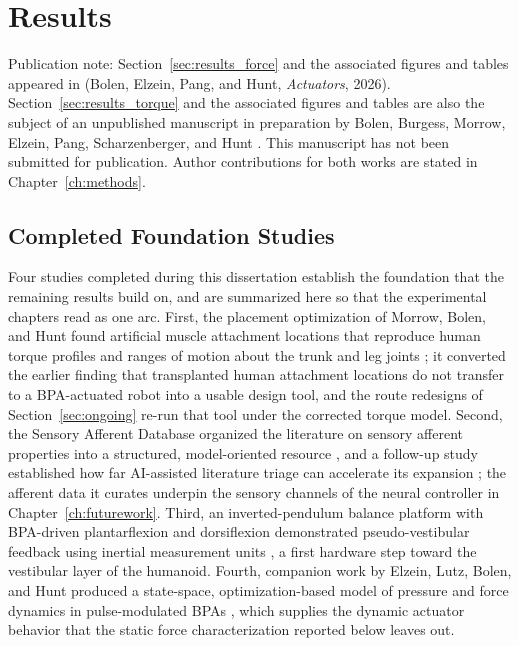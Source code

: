 \chapter{Results}\label{ch:results}

{\doublespacing\normalsize\upshape
\noindent Publication note: Section~\ref{sec:results_force} and the associated figures and tables appeared in \citet{bolen_2026} (Bolen, Elzein, Pang, and Hunt, \emph{Actuators}, 2026). Section~\ref{sec:results_torque} and the associated figures and tables are also the subject of an unpublished manuscript in preparation by Bolen, Burgess, Morrow, Elzein, Pang, Scharzenberger, and Hunt \citep{bolen_isometric_2025}. This manuscript has not been submitted for publication. Author contributions for both works are stated in Chapter~\ref{ch:methods}.\par}

\section{Completed Foundation Studies}\label{sec:foundation}

Four studies completed during this dissertation establish the foundation that the remaining results build on, and are summarized here so that the experimental chapters read as one arc. First, the placement optimization of Morrow, Bolen, and Hunt found artificial muscle attachment locations that reproduce human torque profiles and ranges of motion about the trunk and leg joints \citep{morrow_optimization_2020}; it converted the earlier finding that transplanted human attachment locations do not transfer to a BPA-actuated robot \citep{bolen_bipedal_2019, bolen_determination_2019} into a usable design tool, and the route redesigns of Section~\ref{sec:ongoing} re-run that tool under the corrected torque model. Second, the Sensory Afferent Database organized the literature on sensory afferent properties into a structured, model-oriented resource \citep{bolen_sensory_2023}, and a follow-up study established how far AI-assisted literature triage can accelerate its expansion \citep{bolen_using_2024}; the afferent data it curates underpin the sensory channels of the neural controller in Chapter~\ref{ch:futurework}. Third, an inverted-pendulum balance platform with BPA-driven plantarflexion and dorsiflexion demonstrated pseudo-vestibular feedback using inertial measurement units \citep{bolen_balance_2024, bolen_selfbalancing_2024, bolen_selfbalancing_srs_2024}, a first hardware step toward the vestibular layer of the humanoid. Fourth, companion work by Elzein, Lutz, Bolen, and Hunt produced a state-space, optimization-based model of pressure and force dynamics in pulse-modulated BPAs \citep{elzein_pressure_2025}, which supplies the dynamic actuator behavior that the static force characterization reported below leaves out.

